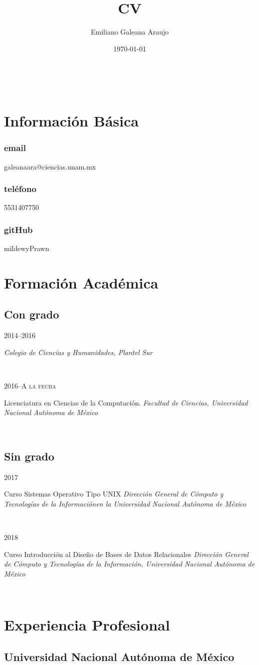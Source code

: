 \documentclass{article}
\makeatletter
\renewcommand{\maketitle}{
  \begin{center}
    {\huge\bfseries
      \theauthor}
    \vspace{.25em}\\
\end{center}
  }
\newcommand{\UNAM}{Universidad Nacional Aut\'onoma de M\'exico}
\newcommand{\CCH}{Colegio de Ciencias y Humanidades, Plantel Sur}
\newcommand{\FC}{Facultad de Ciencias}
\newcommand{\DGTIC}{Direcci\'on General de C\'omputo y Tecnolog\'ias de la
  Informaci\'on}
\newcommand{\entry}[4]{
  
  \begin{minipage}[t]{.15\textwidth}
    \hfill \textsc{#1}
  \end{minipage}
  \hfill\vline\hfill
  \begin{minipage}[t]{.80\textwidth}
    #2
    \textit{#3}
    \footnotesize{#4}
  \end{minipage}\\\vspace{.25cm}
}
\makeatother
\begin{document}
\title{CV}
\author{Emiliano Galeana Araujo}
\date{\today}

\maketitle

\section{Informaci\'on B\'asica}

\subsubsection{email} galeanaara@ciencias.unam.mx

\subsubsection{tel\'efono} 5531407750

\subsubsection{gitHub} mildewyPrawn

\section{Formaci\'on Acad\'emica}

\subsection{Con grado}
\entry{2014--2016}
{}
{\CCH}
{}

\entry{2016--A la fecha}
{Licenciatura en Ciencias de la Computación.}
{\FC, \UNAM}
{}

\subsection{Sin grado}
\entry{2017}
{Curso Sistemas Operativo Tipo UNIX}
{\DGTIC en la \UNAM}
{}

\entry{2018}
{Curso Introducci\'on al Diseño de Bases de Datos Relacionales}
{\DGTIC, \UNAM}
{}


\section{Experiencia Profesional}

\subsection{\UNAM}
\end{document}
